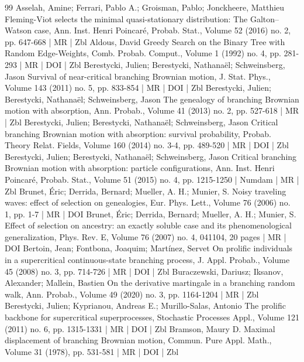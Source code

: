 \documentclass[10pt]{amsart}
\theoremstyle{definition}\newtheorem{defi}[theo]{Definition}\newtheorem{rema}[theo]{Remark}\newtheorem{exam}[theo]{Example}\newtheorem{exem}[theo]{Example}\newtheorem{nota}[theo]{Notation}
\newcommand{\1} {\mathds{1}}
\begin{document}
\begin{thebibliography}{99}
Asselah, Amine; Ferrari, Pablo A.; Groisman, Pablo; Jonckheere, Matthieu Fleming-Viot selects the minimal quasi-stationary distribution: The Galton–Watson case, Ann. Inst. Henri Poincaré, Probab. Stat., Volume 52 (2016) no. 2, pp. 647-668 | MR | Zbl
Aldous, David Greedy Search on the Binary Tree with Random Edge-Weights, Comb. Probab. Comput., Volume 1 (1992) no. 4, pp. 281-293 | MR | DOI | Zbl
Berestycki, Julien; Berestycki, Nathanaël; Schweinsberg, Jason Survival of near-critical branching Brownian motion, J. Stat. Phys., Volume 143 (2011) no. 5, pp. 833-854 | MR | DOI | Zbl
Berestycki, Julien; Berestycki, Nathanaël; Schweinsberg, Jason The genealogy of branching Brownian motion with absorption, Ann. Probab., Volume 41 (2013) no. 2, pp. 527-618 | MR | Zbl
Berestycki, Julien; Berestycki, Nathanaël; Schweinsberg, Jason Critical branching Brownian motion with absorption: survival probability, Probab. Theory Relat. Fields, Volume 160 (2014) no. 3-4, pp. 489-520 | MR | DOI | Zbl
Berestycki, Julien; Berestycki, Nathanaël; Schweinsberg, Jason Critical branching Brownian motion with absorption: particle configurations, Ann. Inst. Henri Poincaré, Probab. Stat., Volume 51 (2015) no. 4, pp. 1215-1250 | Numdam | MR | Zbl
Brunet, Éric; Derrida, Bernard; Mueller, A. H.; Munier, S. Noisy traveling waves: effect of selection on genealogies, Eur. Phys. Lett., Volume 76 (2006) no. 1, pp. 1-7 | MR | DOI
Brunet, Éric; Derrida, Bernard; Mueller, A. H.; Munier, S. Effect of selection on ancestry: an exactly soluble case and its phenomenological generalization, Phys. Rev. E, Volume 76 (2007) no. 4, 041104, 20 pages | MR | DOI
Bertoin, Jean; Fontbona, Joaquim; Martínez, Servet On prolific individuals in a supercritical continuous-state branching process, J. Appl. Probab., Volume 45 (2008) no. 3, pp. 714-726 | MR | DOI | Zbl
Buraczewski, Dariusz; Iksanov, Alexander; Mallein, Bastien On the derivative martingale in a branching random walk, Ann. Probab., Volume 49 (2020) no. 3, pp. 1164-1204 | MR | Zbl
Berestycki, Julien; Kyprianou, Andreas E.; Murillo-Salas, Antonio The prolific backbone for supercritical superprocesses, Stochastic Processes Appl., Volume 121 (2011) no. 6, pp. 1315-1331 | MR | DOI | Zbl
Bramson, Maury D. Maximal displacement of branching Brownian motion, Commun. Pure Appl. Math., Volume 31 (1978), pp. 531-581 | MR | DOI | Zbl

\end{thebibliography}
\end{document}
